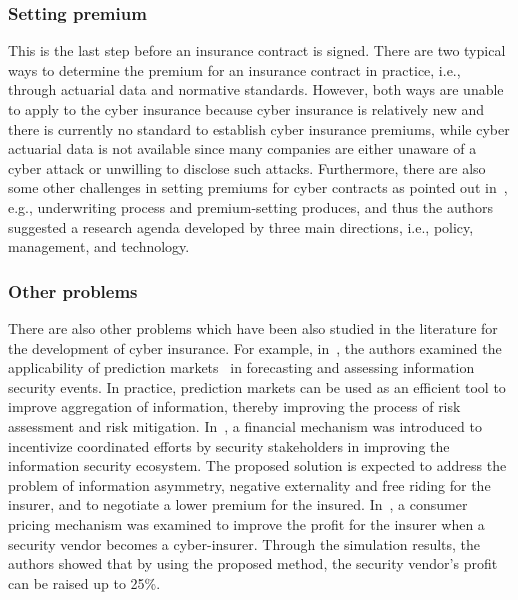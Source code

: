 \documentclass[twocolumn,10pt]{IEEEtran}
\begin{document}
\subsubsection{Setting premium}

This is the last step before an insurance contract is signed. There are two typical ways to determine the premium for an insurance contract in practice, i.e., through actuarial data and normative standards. However, both ways are unable to apply to the cyber insurance because cyber insurance is relatively new and there is currently no standard to establish cyber insurance premiums, while cyber actuarial data is not available since many companies are either unaware of a cyber attack or unwilling to disclose such attacks. Furthermore, there are also some other challenges in setting premiums for cyber contracts as pointed out in~\cite{Toregas2014Insurance}, e.g., underwriting process and premium-setting produces, and thus the authors suggested a research agenda developed by three main directions, i.e., policy, management, and technology. 


\subsubsection{Other problems}

There are also other problems which have been also studied in the literature for the development of cyber insurance. For example, in~\cite{Pandey2014Applicability}, the authors examined the applicability of prediction markets~\cite{Wolfers2006Prediction} in forecasting and assessing information security events. In practice, prediction markets can be used as an efficient tool to improve aggregation of information, thereby improving the process of risk assessment and risk mitigation. In~\cite{Pandey2015Anovel}, a financial mechanism was introduced to incentivize coordinated efforts by security stakeholders in improving the information security ecosystem. The proposed solution is expected to address the problem of information asymmetry, negative externality and free riding for the insurer, and to negotiate a lower premium for the insured. In~\cite{Pal2013On}, a consumer pricing mechanism was examined to improve the profit for the insurer when a security vendor becomes a cyber-insurer. Through the simulation results, the authors showed that by using the proposed method, the security vendor's profit can be raised up to 25\%. 
\end{document}
